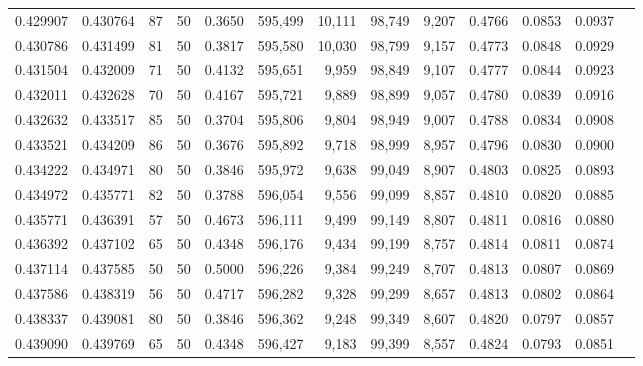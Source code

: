 \begin{tabular}{rrrrrrrrrrrrr}
0.429907 & 0.430764 &    87 &  50 &                                     0.3650 & 595,499 &  10,111 &  98,749 &   9,207 & 0.4766 & 0.0853 & 0.0937 \\
0.430786 & 0.431499 &    81 &  50 &                                     0.3817 & 595,580 &  10,030 &  98,799 &   9,157 & 0.4773 & 0.0848 & 0.0929 \\
0.431504 & 0.432009 &    71 &  50 &                                     0.4132 & 595,651 &   9,959 &  98,849 &   9,107 & 0.4777 & 0.0844 & 0.0923 \\
0.432011 & 0.432628 &    70 &  50 &                                     0.4167 & 595,721 &   9,889 &  98,899 &   9,057 & 0.4780 & 0.0839 & 0.0916 \\
0.432632 & 0.433517 &    85 &  50 &                                     0.3704 & 595,806 &   9,804 &  98,949 &   9,007 & 0.4788 & 0.0834 & 0.0908 \\
0.433521 & 0.434209 &    86 &  50 &                                     0.3676 & 595,892 &   9,718 &  98,999 &   8,957 & 0.4796 & 0.0830 & 0.0900 \\
0.434222 & 0.434971 &    80 &  50 &                                     0.3846 & 595,972 &   9,638 &  99,049 &   8,907 & 0.4803 & 0.0825 & 0.0893 \\
0.434972 & 0.435771 &    82 &  50 &                                     0.3788 & 596,054 &   9,556 &  99,099 &   8,857 & 0.4810 & 0.0820 & 0.0885 \\
0.435771 & 0.436391 &    57 &  50 &                                     0.4673 & 596,111 &   9,499 &  99,149 &   8,807 & 0.4811 & 0.0816 & 0.0880 \\
0.436392 & 0.437102 &    65 &  50 &                                     0.4348 & 596,176 &   9,434 &  99,199 &   8,757 & 0.4814 & 0.0811 & 0.0874 \\
0.437114 & 0.437585 &    50 &  50 &                                     0.5000 & 596,226 &   9,384 &  99,249 &   8,707 & 0.4813 & 0.0807 & 0.0869 \\
0.437586 & 0.438319 &    56 &  50 &                                     0.4717 & 596,282 &   9,328 &  99,299 &   8,657 & 0.4813 & 0.0802 & 0.0864 \\
0.438337 & 0.439081 &    80 &  50 &                                     0.3846 & 596,362 &   9,248 &  99,349 &   8,607 & 0.4820 & 0.0797 & 0.0857 \\
0.439090 & 0.439769 &    65 &  50 &                                     0.4348 & 596,427 &   9,183 &  99,399 &   8,557 & 0.4824 & 0.0793 & 0.0851 \\

\end{tabular}
